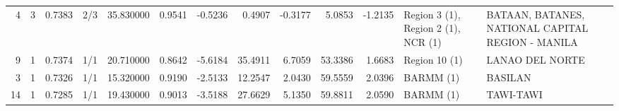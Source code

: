 \begin{tabular}{rrrlrrrrrrrll}
4 & 3 & {\cellcolor[HTML]{5E7DE7}} \color[HTML]{F1F1F1} 0.7383 & 2/3 & {\cellcolor[HTML]{F59C7D}} \color[HTML]{000000} 35.830000 & 0.9541 & -0.5236 & 0.4907 & -0.3177 & 5.0853 & -1.2135 & Region 3 (1), Region 2 (1), NCR (1) & BATAAN, BATANES, NATIONAL CAPITAL REGION - MANILA \\
9 & 1 & {\cellcolor[HTML]{5A78E4}} \color[HTML]{F1F1F1} 0.7374 & 1/1 & {\cellcolor[HTML]{7A9DF8}} \color[HTML]{F1F1F1} 20.710000 & 0.8642 & -5.6184 & 35.4911 & 6.7059 & 53.3386 & 1.6683 & Region 10 (1) & LANAO DEL NORTE \\
3 & 1 & {\cellcolor[HTML]{4961D2}} \color[HTML]{F1F1F1} 0.7326 & 1/1 & {\cellcolor[HTML]{3B4CC0}} \color[HTML]{F1F1F1} 15.320000 & 0.9190 & -2.5133 & 12.2547 & 2.0430 & 59.5559 & 2.0396 & BARMM (1) & BASILAN \\
14 & 1 & {\cellcolor[HTML]{3B4CC0}} \color[HTML]{F1F1F1} 0.7285 & 1/1 & {\cellcolor[HTML]{6A8BEF}} \color[HTML]{F1F1F1} 19.430000 & 0.9013 & -3.5188 & 27.6629 & 5.1350 & 59.8811 & 2.0590 & BARMM (1) & TAWI-TAWI \\
\bottomrule
\end{tabular}
